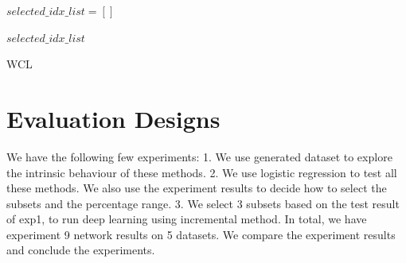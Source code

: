 
\begin{algorithm}[H]

$selected\_idx\_list = []$ \;



\Return $selected\_idx\_list$ \;

\caption{WCL}
\end{algorithm}


\section{Evaluation Designs}
We have the following few experiments:
1. We use generated dataset to explore the intrinsic behaviour of these methods.
2. We use logistic regression to test all these methods. We also use the experiment results to decide how to select the subsets and the percentage range.
3. We select 3 subsets based on the test result of exp1, to run deep learning using incremental method. In total, we have experiment 9 network results on 5 datasets. We compare the experiment results and conclude the experiments.
